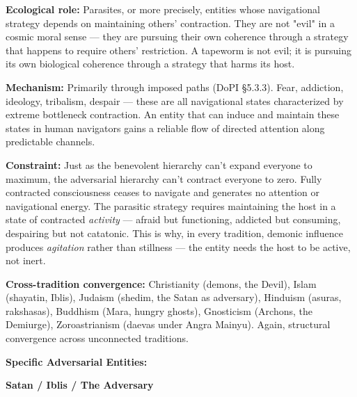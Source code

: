 \textbf{Ecological role:} Parasites, or more precisely, entities whose navigational strategy depends on maintaining others' contraction. They are not "evil" in a cosmic moral sense — they are pursuing their own coherence through a strategy that happens to require others' restriction. A tapeworm is not evil; it is pursuing its own biological coherence through a strategy that harms its host.


\textbf{Mechanism:} Primarily through imposed paths (DoPI §5.3.3). Fear, addiction, ideology, tribalism, despair — these are all navigational states characterized by extreme bottleneck contraction. An entity that can induce and maintain these states in human navigators gains a reliable flow of directed attention along predictable channels.


\textbf{Constraint:} Just as the benevolent hierarchy can't expand everyone to maximum, the adversarial hierarchy can't contract everyone to zero. Fully contracted consciousness ceases to navigate and generates no attention or navigational energy. The parasitic strategy requires maintaining the host in a state of contracted \textit{activity} — afraid but functioning, addicted but consuming, despairing but not catatonic. This is why, in every tradition, demonic influence produces \textit{agitation} rather than stillness — the entity needs the host to be active, not inert.


\textbf{Cross-tradition convergence:} Christianity (demons, the Devil), Islam (shayatin, Iblis), Judaism (shedim, the Satan as adversary), Hinduism (asuras, rakshasas), Buddhism (Mara, hungry ghosts), Gnosticism (Archons, the Demiurge), Zoroastrianism (daevas under Angra Mainyu). Again, structural convergence across unconnected traditions.


\textbf{Specific Adversarial Entities:}


\textbf{Satan / Iblis / The Adversary}

